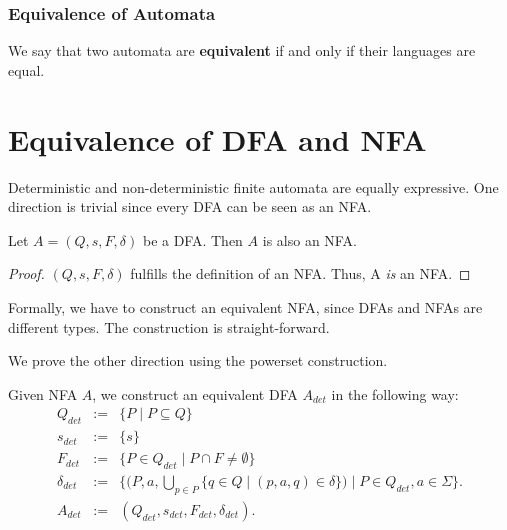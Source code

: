 \subsubsection{Equivalence of Automata}
\begin{definition}
    We say that two automata are \textbf{equivalent} if and only if their languages are equal.
\end{definition}

\section{Equivalence of DFA and NFA}
 
Deterministic and non-deterministic finite automata are equally expressive. 
One direction is trivial since every DFA can be seen as an NFA. 

\begin{theorem}
    \label{dfa_to_nfa}
    Let $A=(Q,s,F,\delta)$ be a DFA. Then $A$ is also an NFA.
\end{theorem}
\begin{proof}
    $(Q,s,F,\delta)$ fulfills the definition of an NFA. Thus, A \textit{is} an NFA.
\end{proof}

Formally, we have to construct an equivalent NFA, since DFAs and NFAs are different types.
The construction is straight-forward.

We prove the other direction using the powerset construction. 

\begin{definition}
Given NFA $A$, we construct an equivalent DFA $A_{det}$ in the following way:
\begin{eqnarray*}
    Q_{det} & := & \{P \; | \; P \subseteq Q\} \\
    {s}_{det} & := & \{ s \} \\
    F_{det} & := & \{ P \in Q_{det} \; | \; P \cap F \neq \emptyset \} \\
    \delta_{det} & := & \{ (P,a,\bigcup \limits _{p \in P} \{ q \in Q \; | \; (p,a,q) \in \delta \}) \; | \; P \in Q_{det}, a \in \Sigma \}.     \\
    A_{det} &:=&  (Q_{det}, s_{det}, F_{det}, \delta_{det}).
\end{eqnarray*}
\end{definition}

